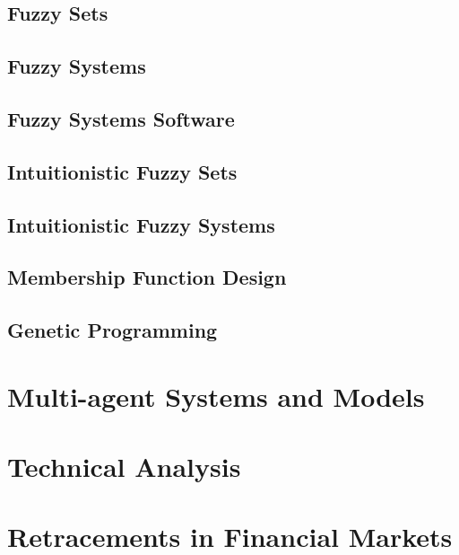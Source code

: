 \subsection{Fuzzy Sets}
\label{subsection:fuzzy-sets}

\subsection{Fuzzy Systems}
\label{subsection:fuzzy-systems}

\subsection{Fuzzy Systems Software}
\label{subsection:fuzzy-systems-software}

\subsection{Intuitionistic Fuzzy Sets}
\label{subsection:intuitionistic-fuzzy-sets}

\subsection{Intuitionistic Fuzzy Systems}
\label{subsection:intuitionistic-fuzzy-systems}

\subsection{Membership Function Design}
\label{subsection:membership-function-design}

\subsection{Genetic Programming}
\label{subsection:genetic-programming}

\section{Multi-agent Systems and Models}
\label{section:multi-agent-systems-and-models}

\section{Technical Analysis}
\label{section:technical-analysis}

\section{Retracements in Financial Markets}
\label{section:retracements-in-financial-markets}

